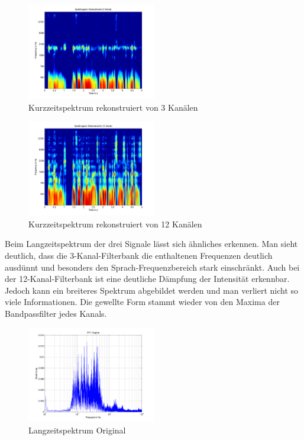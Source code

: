 \documentclass[conference]{IEEEtran}
\begin{document}
\begin{compactenum}[a)]
\begin{figure}[h!]
	\centering
	\includegraphics[width=0.5\textwidth]{img/spect_rec_3.png}
	\caption{Kurzzeitspektrum rekonstruiert von 3 Kanälen}
	\label{fig:spect-rec-3}
\end{figure}

\begin{figure}[h!]
	\centering
	\includegraphics[width=0.5\textwidth]{img/spect_rec_12.png}
	\caption{Kurzzeitspektrum rekonstruiert von 12 Kanälen}
	\label{fig:spect-rec-12}
\end{figure}

\item Beim Langzeitspektrum der drei Signale lässt sich ähnliches erkennen. Man sieht deutlich, dass die 3-Kanal-Filterbank die enthaltenen Frequenzen deutlich ausdünnt und besonders den Sprach-Frequenzbereich stark einschränkt. Auch bei der 12-Kanal-Filterbank ist eine deutliche Dämpfung der Intensität erkennbar. Jedoch kann ein breiteres Spektrum abgebildet werden und man verliert nicht so viele Informationen. Die gewellte Form stammt wieder von den Maxima der Bandpassfilter jedes Kanals.
\begin{figure}[h!]
	\centering
	\includegraphics[width=0.5\textwidth]{img/fft_orig.png}
	\caption{Langzeitspektrum Original}
	\label{fig:fft-orig}
\end{figure}


\end{compactenum}
\end{document}
